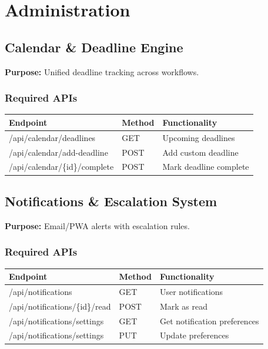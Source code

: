 \documentclass[11pt,a4paper]{article}
\begin{document}
\section{Administration}

\subsection{Calendar \& Deadline Engine}

\textbf{Purpose:} Unified deadline tracking across workflows.

\subsubsection{Required APIs}

\begin{longtable}{|p{5cm}|p{2cm}|p{6cm}|}
\hline
\textbf{Endpoint} & \textbf{Method} & \textbf{Functionality} \\
\hline
/api/calendar/deadlines & GET & Upcoming deadlines \\
/api/calendar/add-deadline & POST & Add custom deadline \\
/api/calendar/\{id\}/complete & POST & Mark deadline complete \\
\hline
\end{longtable}

\subsection{Notifications \& Escalation System}

\textbf{Purpose:} Email/PWA alerts with escalation rules.

\subsubsection{Required APIs}

\begin{longtable}{|p{5cm}|p{2cm}|p{6cm}|}
\hline
\textbf{Endpoint} & \textbf{Method} & \textbf{Functionality} \\
\hline
/api/notifications & GET & User notifications \\
/api/notifications/\{id\}/read & POST & Mark as read \\
/api/notifications/settings & GET & Get notification preferences \\
/api/notifications/settings & PUT & Update preferences \\
\hline
\end{longtable}
\end{document}
